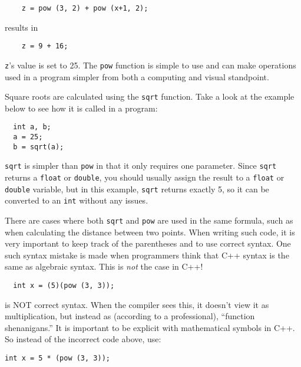 \begin{lstlisting}
	z = pow (3, 2) + pow (x+1, 2);
\end{lstlisting}
results in
\begin{lstlisting}
	z = 9 + 16;
\end{lstlisting}	
	
	\texttt{z}'s value is set to 25. 
	The \texttt{pow} function is simple to use and can make operations used in 
a program simpler from both a computing and visual standpoint.

	Square roots are calculated using the \texttt{sqrt} function. 
	Take a look at the example below to see how it is called in a program:

\begin{lstlisting}
  int a, b;
  a = 25;
  b = sqrt(a);
\end{lstlisting}


	\texttt{sqrt} is simpler than \texttt{pow} in that it only requires one parameter. 
	Since \texttt{sqrt} returns a \texttt{float} or \texttt{double}, you should usually assign the result to a \texttt{float} or \texttt{double} variable, but in this example, \texttt{sqrt} returns exactly 5, so it can be converted to an \texttt{int} without any issues. 
	
	There are cases where both \texttt{sqrt} and \texttt{pow} are used in the same formula, such as when calculating the distance between two points. 
	When writing such code, it is very important to keep track of the parentheses and to use correct syntax. 
	One such syntax mistake is made when programmers think that C++ syntax is the same as algebraic syntax. 
	This is \emph{not} the case in C++!

\begin{lstlisting}
  int x = (5)(pow (3, 3));
\end{lstlisting}

is NOT correct syntax. 
When the compiler sees this, it doesn't view it as multiplication, but instead as (according to a professional), ``function shenanigans.'' 
It is important to be explicit with mathematical symbols in C++. 
So instead of the incorrect code above, use:

\begin{lstlisting}
int x = 5 * (pow (3, 3));
\end{lstlisting}

